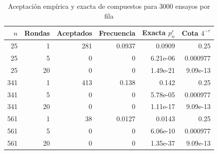 \begin{table}[H]\centering\small
\caption{Aceptación empírica y exacta de compuestos para 3000 ensayos por fila}
\label{tab:error}
\begin{tabular}{rrrrrr}\toprule
$n$ & Rondas & Aceptados & Frecuencia & Exacta $p_n^r$ & Cota $4^{-r}$ \\
\midrule
25 & 1 & 281 & 0.0937 & 0.0909 & 0.25 \\
25 & 5 & 0 & 0 & 6.21e-06 & 0.000977 \\
25 & 20 & 0 & 0 & 1.49e-21 & 9.09e-13 \\
341 & 1 & 413 & 0.138 & 0.142 & 0.25 \\
341 & 5 & 0 & 0 & 5.78e-05 & 0.000977 \\
341 & 20 & 0 & 0 & 1.11e-17 & 9.09e-13 \\
561 & 1 & 38 & 0.0127 & 0.0143 & 0.25 \\
561 & 5 & 0 & 0 & 6.06e-10 & 0.000977 \\
561 & 20 & 0 & 0 & 1.35e-37 & 9.09e-13 \\
\bottomrule\end{tabular}\end{table}
